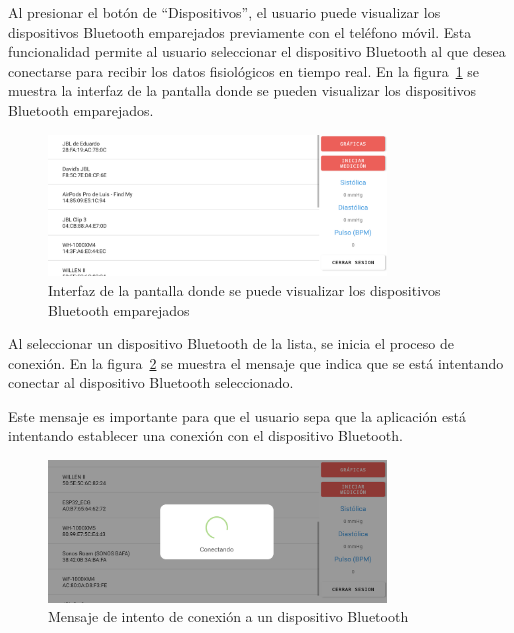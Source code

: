     Al presionar el botón de ``Dispositivos'', el usuario puede visualizar los dispositivos Bluetooth emparejados previamente con el teléfono móvil. Esta funcionalidad permite al usuario seleccionar el dispositivo Bluetooth al que desea conectarse para recibir los datos fisiológicos en tiempo real. En la figura~\ref{fig:Android_DispositivosBT} se muestra la interfaz de la pantalla donde se pueden visualizar los dispositivos Bluetooth emparejados.

    \begin{figure}[H]
        \centering
        \includegraphics[width=0.8\textwidth]{img/Resultados/android_dispositivosBT.png}
        \caption[Interfaz de la pantalla donde se puede visualizar los dispositivos Bluetooth emparejados.]{Interfaz de la pantalla donde se puede visualizar los dispositivos Bluetooth emparejados\footnotemark}
        \label{fig:Android_DispositivosBT}
    \end{figure}

    Al seleccionar un dispositivo Bluetooth de la lista, se inicia el proceso de conexión. En la figura~\ref{fig:Android_Conectando} se muestra el mensaje que indica que se está intentando conectar al dispositivo Bluetooth seleccionado.

    Este mensaje es importante para que el usuario sepa que la aplicación está intentando establecer una conexión con el dispositivo Bluetooth.

    \begin{figure}[H]
        \centering
        \includegraphics[width=0.8\textwidth]{img/Resultados/android_conectando.png}
        \caption[Mensaje de intento de conexión a un dispositivo Bluetooth.]{Mensaje de intento de conexión a un dispositivo Bluetooth\footnotemark}
        \label{fig:Android_Conectando}
    \end{figure}

